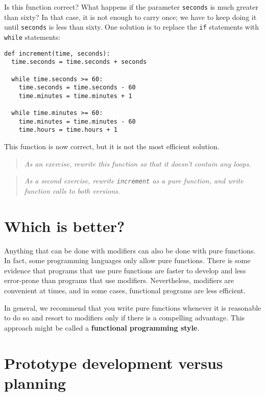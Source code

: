 Is this function correct?  What happens if the parameter {\tt seconds} is
much greater than sixty?  In that case, it is not enough to carry
once; we have to keep doing it until {\tt seconds} is less than sixty.
One solution is to
replace the {\tt if} statements with {\tt while}
statements:

\beforeverb
\begin{verbatim}
def increment(time, seconds):
  time.seconds = time.seconds + seconds

  while time.seconds >= 60:
    time.seconds = time.seconds - 60
    time.minutes = time.minutes + 1

  while time.minutes >= 60:
    time.minutes = time.minutes - 60
    time.hours = time.hours + 1
\end{verbatim}
\afterverb
%
This function is now correct, but it is not the most efficient
solution.

\begin{quote}
{\em As an exercise, rewrite this function so that it doesn't contain 
any loops.}
\end{quote}

\begin{quote}
{\em As a second exercise, rewrite {\tt increment} as a pure function, and
write function calls to both versions.}
\end{quote}


\section{Which is better?}


Anything that can be done with modifiers can also be done with pure
functions.  In fact, some programming languages only allow pure
functions.  There is some evidence that programs that use pure
functions are faster to develop and less error-prone than programs
that use modifiers.  Nevertheless, modifiers are convenient at times,
and in some cases, functional programs are less efficient.

In general, we recommend that you write pure functions whenever it is
reasonable to do so and resort to modifiers only if there is a
compelling advantage.  This approach might be called a {\bf functional
programming style}.


\section{Prototype development versus planning}
\label{convert}

